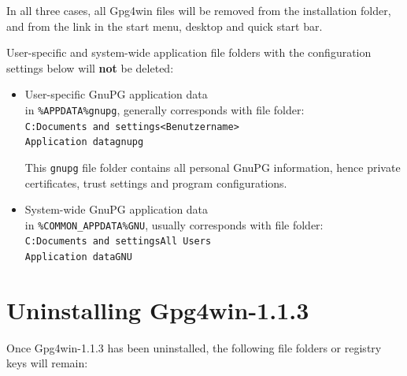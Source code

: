 \documentclass[a4paper,11pt,oneside,openright,titlepage]{scrbook}
\newcommand{\Filename}[1]{\small{\texttt{#1}}\normalsize}
\begin{document}
\newpage
In all three cases, all Gpg4win files will be removed from the
installation folder, and from the link in the start menu, desktop and
quick start bar.

User-specific and system-wide application file folders with the
configuration settings below will \textbf{not} be deleted:

\begin{itemize}
    \item User-specific GnuPG application data\\
        in \Filename{\%APPDATA\%\back{}gnupg}, generally corresponds
        with file folder: \\
        \Filename{C:\back{}Documents and settings\back{}<Benutzername>\back{}\\
        Application data\back{}gnupg\back{}}

        This \Filename{gnupg} file folder contains all personal GnuPG
        information, hence private certificates, trust settings and
        program configurations.

    \item System-wide GnuPG application data\\ in
        \Filename{\%COMMON\_APPDATA\%\back{}GNU}, usually corresponds with
        file folder: \\ \Filename{C:\back{}Documents and
        settings\back{}All
        Users\back{}\\
        Application data\back{}GNU\back{}}
\end{itemize}


\section*{Uninstalling Gpg4win-1.1.3}

Once Gpg4win-1.1.3 has been uninstalled, the following file folders or
registry keys will remain:
\end{document}
